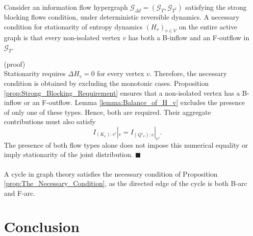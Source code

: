 \documentclass{comnet}%
\begin{document}
\begin{proposition}
	Consider an information flow hypergraph $\mathcal{G}_{\Delta I} = (\mathcal{G}_{T}, \mathcal{G}_{T^{\dagger}})$ satisfying the strong blocking flows condition, under deterministic reversible dynamics. A necessary condition for stationarity of entropy dynamics $(H_{v})_{v \in V}$ on the entire active graph is that every non-isolated vertex $v$ has both a B-inflow and an F-outflow in $\mathcal{G}_{T}$.\\
	\label{prop:The_Necessary_Condition}\end{proposition}
(proof)\\
Stationarity requires $\Delta H_v=0$ for every vertex $v$. Therefore, the necessary condition is obtained by excluding the monotonic cases. Proposition \ref{prop:Strong_Blocking_Requirement} ensures that a non-isolated vertex has a B-inflow or an F-outflow. Lemma \ref{lemma:Balance_of_H_v} excludes the presence of only one of these types. Hence, both are required. Their aggregate contributions must also satisfy
\begin{equation}
 I_{(K_v):v'}|_v=I_{(Q'_v):v}|_{v'}.
\end{equation}
The presence of both flow types alone does not impose this numerical equality or imply stationarity of the joint distribution. $\blacksquare$ \\ \quad \\

A cycle in graph theory satisfies the necessary condition of Proposition \ref{prop:The_Necessary_Condition}, as the directed edge of the cycle is both B-arc and F-arc.\\

\section{\label{sec:Conclusion} Conclusion}
\end{document}
